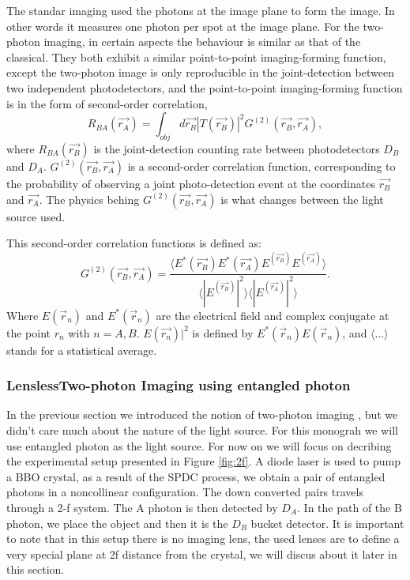 The standar imaging used the photons at the image plane to form the image. In other 
words it measures one photon per spot at the image plane. For the two-photon imaging, in certain 
aspects the behaviour is similar as that of the classical.
They both exhibit a similar point-to-point imaging-forming function, except the 
two-photon image is only reproducible in the joint-detection between two independent photodetectors,
and the point-to-point imaging-forming function is in the form of second-order correlation,
\begin{equation}\label{eq:coincidences}
R_{BA}(\vec{r_A})=\int_{obj} d\vec{r_B} |T(\vec{r_B})|^2 G^{(2)}(\vec{r_B},\vec{r_A}),
\end{equation}
where $R_{BA}(\vec{r_B})$ is the joint-detection counting rate between photodetectors $D_B$ and $D_A$.
$G^{(2)}(\vec{r_B},\vec{r_A})$ is a second-order correlation
function, corresponding to the probability of observing a joint photo-detection event
at the coordinates $\vec{r_B}$ and $\vec{r_A}$. The physics behing $G^{(2)}(\vec{r_B},\vec{r_A})$
is what changes between the light source used.

This second-order correlation functions is defined as\cite{introquantumoptics}:
\begin{equation}
G^{(2)} (\vec{r_B},\vec{r_A})= \frac{ \langle E^* (\vec{r_B}) E^* (\vec{r_A}) E^ (\vec{r_B}) E^ (\vec{r_A}) \rangle }{\langle |E^ (\vec{r_B})|^2 \rangle \langle |E^ (\vec{r_A})|^2 \rangle}.
\end{equation}
Where $E(\vec{r}_n)$ and $E^*(\vec{r}_n)$ are the electrical field and complex conjugate at the point $r_n$ with $n=A,B$. $E (\vec{r_n})|^2$ is defined by $E^*(\vec{r}_n) E(\vec{r}_n)$,
and $\langle ... \rangle$ stands for a statistical average.
\subsubsection{LenslessTwo-photon Imaging using entangled photon}

In the previous section we introduced the notion of two-photon imaging , but we didn't care 
much about the nature of the light source. For this monograh we will use entangled photon as the 
light source. For now on we will focus on decribing the 
experimental setup presented in Figure \ref{fig:2f}. A diode laser is used to pump a BBO crystal, as a result of the
SPDC process, we obtain a pair of entangled photons in a noncollinear configuration. The down converted pairs travels
through a 2-f system. The A photon is then detected by $D_A$. In the path of the B photon, we place the object and then it is the $D_B$
bucket detector. It is important to note that in this setup there is no imaging lens, the used lenses are to define a very special plane at 
2f distance from the crystal, we will discus about it later in this section.


